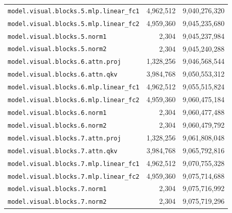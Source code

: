 \documentclass[10pt,a4paper]{article}
\theoremstyle{definition}
\begin{document}
\begin{appendices}
\begin{longtable}{p{9.5cm}rr}
\texttt{model.\allowbreak{}visual.\allowbreak{}blocks.\allowbreak{}5.\allowbreak{}mlp.\allowbreak{}linear\_fc1} & 4,962,512 & 9,040,276,320 \\
\texttt{model.\allowbreak{}visual.\allowbreak{}blocks.\allowbreak{}5.\allowbreak{}mlp.\allowbreak{}linear\_fc2} & 4,959,360 & 9,045,235,680 \\
\texttt{model.\allowbreak{}visual.\allowbreak{}blocks.\allowbreak{}5.\allowbreak{}norm1} & 2,304 & 9,045,237,984 \\
\texttt{model.\allowbreak{}visual.\allowbreak{}blocks.\allowbreak{}5.\allowbreak{}norm2} & 2,304 & 9,045,240,288 \\
\texttt{model.\allowbreak{}visual.\allowbreak{}blocks.\allowbreak{}6.\allowbreak{}attn.\allowbreak{}proj} & 1,328,256 & 9,046,568,544 \\
\texttt{model.\allowbreak{}visual.\allowbreak{}blocks.\allowbreak{}6.\allowbreak{}attn.\allowbreak{}qkv} & 3,984,768 & 9,050,553,312 \\
\texttt{model.\allowbreak{}visual.\allowbreak{}blocks.\allowbreak{}6.\allowbreak{}mlp.\allowbreak{}linear\_fc1} & 4,962,512 & 9,055,515,824 \\
\texttt{model.\allowbreak{}visual.\allowbreak{}blocks.\allowbreak{}6.\allowbreak{}mlp.\allowbreak{}linear\_fc2} & 4,959,360 & 9,060,475,184 \\
\texttt{model.\allowbreak{}visual.\allowbreak{}blocks.\allowbreak{}6.\allowbreak{}norm1} & 2,304 & 9,060,477,488 \\
\texttt{model.\allowbreak{}visual.\allowbreak{}blocks.\allowbreak{}6.\allowbreak{}norm2} & 2,304 & 9,060,479,792 \\
\texttt{model.\allowbreak{}visual.\allowbreak{}blocks.\allowbreak{}7.\allowbreak{}attn.\allowbreak{}proj} & 1,328,256 & 9,061,808,048 \\
\texttt{model.\allowbreak{}visual.\allowbreak{}blocks.\allowbreak{}7.\allowbreak{}attn.\allowbreak{}qkv} & 3,984,768 & 9,065,792,816 \\
\texttt{model.\allowbreak{}visual.\allowbreak{}blocks.\allowbreak{}7.\allowbreak{}mlp.\allowbreak{}linear\_fc1} & 4,962,512 & 9,070,755,328 \\
\texttt{model.\allowbreak{}visual.\allowbreak{}blocks.\allowbreak{}7.\allowbreak{}mlp.\allowbreak{}linear\_fc2} & 4,959,360 & 9,075,714,688 \\
\texttt{model.\allowbreak{}visual.\allowbreak{}blocks.\allowbreak{}7.\allowbreak{}norm1} & 2,304 & 9,075,716,992 \\
\texttt{model.\allowbreak{}visual.\allowbreak{}blocks.\allowbreak{}7.\allowbreak{}norm2} & 2,304 & 9,075,719,296 \\

\end{longtable}
\end{appendices}
\end{document}
